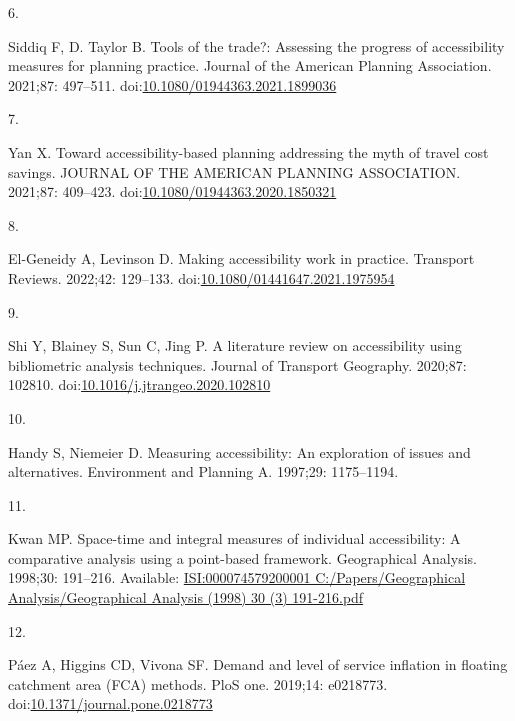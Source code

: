 \documentclass[10pt,letterpaper]{article}
\newlength{\cslhangindent}
\newlength{\csllabelwidth}
\newlength{\cslentryspacingunit} %
\newenvironment{CSLReferences}[2] %
 {%
  \setlength{\parindent}{0pt}
  \ifodd #1
  \let\oldpar\par
  \def\par{\hangindent=\cslhangindent\oldpar}
  \fi
  \setlength{\parskip}{#2\cslentryspacingunit}
 }%
 {}
\newcommand{\CSLLeftMargin}[1]{\parbox[t]{\csllabelwidth}{#1}}
\newcommand{\CSLRightInline}[1]{\parbox[t]{\linewidth - \csllabelwidth}{#1}\break}
\providecommand{\DIFaddbegin}{} %
\providecommand{\DIFaddend}{} %
\providecommand{\DIFdelbegin}{} %
\providecommand{\DIFdelend}{} %
\newcommand{\DIFscaledelfig}{0.5}
\newlength{\DIFdelgraphicswidth} %
\newlength{\DIFdelgraphicsheight} %
\newcommand{\DIFaddincludegraphics}[2][]{{\color{blue}\fbox{\DIFOincludegraphics[#1]{#2}}}} %
\newcommand{\DIFdelincludegraphics}[2][]{%
\sbox{\DIFdelgraphicsbox}{\DIFOincludegraphics[#1]{#2}}%
\settoboxwidth{\DIFdelgraphicswidth}{\DIFdelgraphicsbox} %
\settoboxtotalheight{\DIFdelgraphicsheight}{\DIFdelgraphicsbox} %
\scalebox{\DIFscaledelfig}{%
\parbox[b]{\DIFdelgraphicswidth}{\usebox{\DIFdelgraphicsbox}\\[-\baselineskip] \rule{\DIFdelgraphicswidth}{0em}}\llap{\resizebox{\DIFdelgraphicswidth}{\DIFdelgraphicsheight}{%
\setlength{\unitlength}{\DIFdelgraphicswidth}%
\begin{picture}(1,1)%
\thicklines\linethickness{2pt} %
{\color[rgb]{1,0,0}\put(0,0){\framebox(1,1){}}}%
{\color[rgb]{1,0,0}\put(0,0){\line( 1,1){1}}}%
{\color[rgb]{1,0,0}\put(0,1){\line(1,-1){1}}}%
\end{picture}%
}\hspace*{3pt}}} %
} %
\DeclareRobustCommand{\DIFaddbegin}{\DIFOaddbegin \let\includegraphics\DIFaddincludegraphics} %
\DeclareRobustCommand{\DIFaddend}{\DIFOaddend \let\includegraphics\DIFOincludegraphics} %
\DeclareRobustCommand{\DIFdelbegin}{\DIFOdelbegin \let\includegraphics\DIFdelincludegraphics} %
\DeclareRobustCommand{\DIFdelend}{\DIFOaddend \let\includegraphics\DIFOincludegraphics} %
\begin{document}
\begin{CSLReferences}{0}{0}
\leavevmode{}%
\CSLLeftMargin{6. }%
\CSLRightInline{Siddiq F, D. Taylor B. Tools of the trade?: Assessing
the progress of accessibility measures for planning practice. Journal of
the American Planning Association. 2021;87: 497--511.
doi:\href{https://doi.org/10.1080/01944363.2021.1899036}{10.1080/01944363.2021.1899036}}

\leavevmode{}%
\CSLLeftMargin{7. }%
\CSLRightInline{Yan X. Toward accessibility-based planning addressing
the myth of travel cost savings. {JOURNAL} {OF} {THE} {AMERICAN}
{PLANNING} {ASSOCIATION}. 2021;87: 409--423.
doi:\href{https://doi.org/10.1080/01944363.2020.1850321}{10.1080/01944363.2020.1850321}}

\leavevmode{}%
\CSLLeftMargin{8. }%
\CSLRightInline{El-Geneidy A, Levinson D. Making accessibility work in
practice. Transport Reviews. 2022;42: 129--133.
doi:\href{https://doi.org/10.1080/01441647.2021.1975954}{10.1080/01441647.2021.1975954}}

\leavevmode{}%
\CSLLeftMargin{9. }%
\CSLRightInline{Shi Y, Blainey S, Sun C, Jing P. A literature review on
accessibility using bibliometric analysis techniques. Journal of
Transport Geography. 2020;87: 102810.
doi:\href{https://doi.org/10.1016/j.jtrangeo.2020.102810}{10.1016/j.jtrangeo.2020.102810}}

\leavevmode{}%
\CSLLeftMargin{10. }%
\CSLRightInline{Handy S, Niemeier D. Measuring accessibility: An
exploration of issues and alternatives. Environment and Planning A.
1997;29: 1175--1194. }

\leavevmode{}%
\CSLLeftMargin{11. }%
\CSLRightInline{Kwan MP. Space-time and integral measures of individual
accessibility: A comparative analysis using a point-based framework.
Geographical Analysis. 1998;30: 191--216. Available:
\href{https://ISI:000074579200001\%0AC:/Papers/Geographical\%20Analysis/Geographical\%20Analysis\%20(1998)\%2030\%20(3)\%20191-216.pdf}{ISI:000074579200001
C:/Papers/Geographical Analysis/Geographical Analysis (1998) 30 (3)
191-216.pdf}}

\leavevmode\vadjust pre{\DIFdelbegin %
\DIFdelend \DIFaddbegin \hypertarget{ref-paezDemand2019}{}\DIFaddend }%
\CSLLeftMargin{12. }%
\DIFdelbegin %
\DIFdelend \DIFaddbegin \CSLRightInline{Páez A, Higgins CD, Vivona SF. Demand and level of
service inflation in floating catchment area (FCA) methods. PloS one.
2019;14: e0218773.
doi:\href{https://doi.org/10.1371/journal.pone.0218773}{10.1371/journal.pone.0218773}}
\DIFaddend 


\end{CSLReferences}
\end{document}
